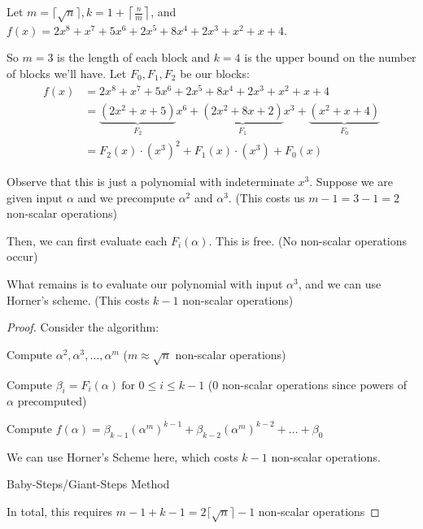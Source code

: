 \begin{example}
    Let $m = \lceil \sqrt{n} \rceil, k = 1 + \left\lceil \frac{n}{m} \right\rceil$, and $f(x) = 2x^8 + x^7 + 5x^6 + 2x^5 + 8x^4 + 2x^3 + x^2 + x + 4$.

    So $m = 3$ is the length of each block and $k = 4$ is the upper bound on the number of blocks we'll have.
    Let $F_0, F_1, F_2$ be our blocks:
    \begin{align*}
        f(x) &= 2x^8 + x^7 + 5x^6 + 2x^5 + 8x^4 + 2x^3 + x^2 + x + 4 \\
        &= \underbrace{(2x^2 + x + 5)}_{F_2}x^6 + 
        \underbrace{(2x^2 + 8x + 2)}_{F_1}x^3 + 
        \underbrace{(x^2 + x + 4)}_{F_0} \\
        &= F_2(x)\cdot(x^3)^2 + F_1(x)\cdot(x^3) + F_0(x)
    \end{align*}

    Observe that this is just a polynomial with indeterminate $x^3$.
    Suppose we are given input $\alpha$ and we precompute $\alpha^2$ and $\alpha^3$. (This costs us $m - 1 = 3 - 1 = 2$ non-scalar operations)
    
    Then, we can first evaluate each $F_i(\alpha)$.
    This is free. (No non-scalar operations occur)

    What remains is to evaluate our polynomial with input $\alpha^3$, and we can use Horner's scheme. (This costs $k - 1$ non-scalar operations)
\end{example}

\begin{proof}
    Consider the algorithm:

    \IncMargin{1em}
    \begin{algorithm}[H]
        \nl Compute $\alpha^2, \alpha^3, \ldots, \alpha^m$ ($m \approx \sqrt{n}$ non-scalar operations)

        \nl Compute $\beta_i = F_i(\alpha) \ \text{for } 0 \leq i \leq k - 1$ ($0$ non-scalar operations since powers of $\alpha$ precomputed)

        \nl Compute $f(\alpha) = \beta_{k-1}(\alpha^m)^{k-1} + \beta_{k-2}(\alpha^m)^{k-2} + \ldots + \beta_0$

        We can use Horner's Scheme here, which costs $k-1$ non-scalar operations.

        \caption{Baby-Steps/Giant-Steps Method}
    \end{algorithm}

    In total, this requires $m - 1 + k - 1 = 2\lceil\sqrt{n}\rceil - 1$ non-scalar operations
\end{proof}


